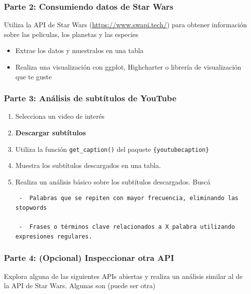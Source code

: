 \documentclass[
  letterpaper,
  DIV=11,
  numbers=noendperiod]{scrreprt}
\providecommand{\tightlist}{%
  \setlength{\itemsep}{0pt}\setlength{\parskip}{0pt}}
\begin{document}
\subsubsection{Parte 2: Consumiendo datos de Star
Wars}\label{parte-2-consumiendo-datos-de-star-wars}

Utiliza la API de Star Wars (\url{https://www.swapi.tech/}) para obtener
información sobre las peliculas, los planetas y las especies

\begin{itemize}
\tightlist
\item
  Extrae los datos y muestralos en una tabla\\
\item
  Realiza una visualización con ggplot, Highcharter o librería de
  visualización que te guste
\end{itemize}

\subsubsection{Parte 3: Análisis de subtítulos de
YouTube}\label{parte-3-anuxe1lisis-de-subtuxedtulos-de-youtube}

\begin{enumerate}
\def\labelenumi{\arabic{enumi}.}
\item
  Selecciona un video de interés
\item
  \textbf{Descargar subtítulos}
\item
  Utiliza la función \texttt{get\_caption()} del paquete
  \texttt{\{youtubecaption\}}
\item
  Muestra los subtítulos descargados en una tabla.
\item
  Realiza un análisis básico sobre los subtítulos descargados. Buscá

\begin{verbatim}
 -  Palabras que se repiten con mayor frecuencia, eliminando las stopwords

 -  Frases o términos clave relacionados a X palabra utilizando expresiones regulares.
\end{verbatim}
\end{enumerate}

\subsubsection{Parte 4: (Opcional) Inspeccionar otra
API}\label{parte-4-opcional-inspeccionar-otra-api}

Explora alguna de las siguientes APIs abiertas y realiza un análisis
similar al de la API de Star Wars. Algunas son (puede ser otra)
\end{document}
